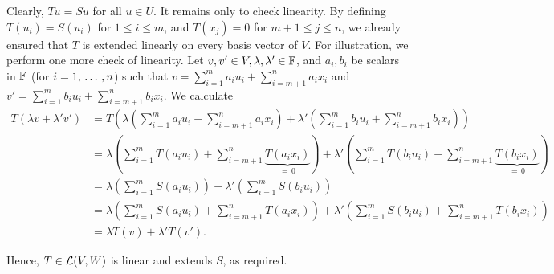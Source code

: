 \begin{xrcs}
\begin{xprf}
    Clearly, $T u = S u$ for all $u \in U$. It remains only to check linearity. By defining $T(u_i)=S(u_i)$ for $1 \leq i \leq m$, and $T(x_j) = 0$ for $m+1 \leq j \leq n$, we already ensured that $T$ is extended linearly on every basis vector of $V$. For illustration, we perform one more check of linearity. Let $v, v' \in V, \lambda, \lambda' \in \mathbb{F}$, and $a_i, b_i$ be scalars in $\mathbb{F}$ (for $i=1, {\, \ldots \,\,}, n$) such that $v = \sum_{i=1}^{m}a_i u_i + \sum_{i=m+1}^{n}a_i x_i$ and
    $v' = \sum_{i=1}^{m}b_i u_i + \sum_{i=m+1}^{n}b_i x_i$. We calculate
    \begin{equation}
      \begin{aligned}
        T\left(\lambda v + \lambda' v'\right)
          &= T\left(\lambda\left(\sum_{i=1}^{m}a_i u_i + \sum_{i=m+1}^{n}a_i x_i\right)
            + \lambda' \left(\sum_{i=1}^{m}b_i u_i + \sum_{i=m+1}^{n}b_i x_i\right)\right)  \\
          &= \lambda   \left(
               \sum_{i=1}^{m}T \left(a_i u_i\right) + \sum_{i=m+1}^{n}\underbrace{T \left(a_i x_i \right)}_{= \, 0}
               \right) +
              \lambda' \left(
                \sum_{i=1}^{m}T \left(b_i u_i\right) + \sum_{i=m+1}^{n}\underbrace{T \left(b_i x_i\right)}_{= \, 0}
              \right) \\
          &= \lambda  \left(\sum_{i=1}^{m}S \left(a_i u_i\right)\right)  +
             \lambda' \left(\sum_{i=1}^{m}S \left(b_i u_i\right) \right)\\
          &= \lambda   \left(
                \sum_{i=1}^{m}S \left(a_i u_i\right) + \sum_{i=m+1}^{n}T \left(a_i x_i \right)
                \right) +
                \lambda' \left(
                \sum_{i=1}^{m}S \left(b_i u_i\right) + \sum_{i=m+1}^{n}T \left(b_i x_i\right)
                \right) \\
          &= \lambda T(v) + \lambda' T(v').
      \end{aligned}
    \end{equation}

    Hence, $T \in \mathcal{L}(V,W)$ is linear and extends $S$, as required.
  \end{xprf}
\end{xrcs}

